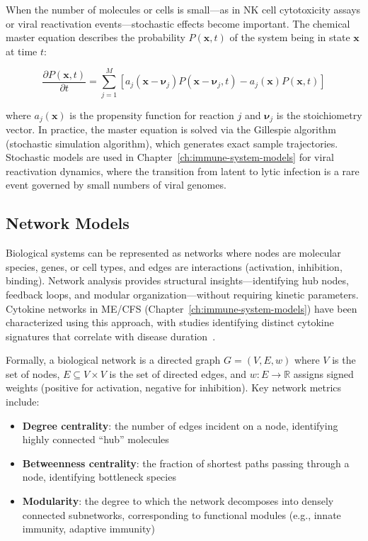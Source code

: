 When the number of molecules or cells is small---as in NK cell cytotoxicity assays or viral reactivation events---stochastic effects become important. The chemical master equation describes the probability $P(\mathbf{x}, t)$ of the system being in state $\mathbf{x}$ at time $t$:

\begin{equation}
\label{eq:master-equation}
\frac{\partial P(\mathbf{x}, t)}{\partial t} = \sum_{j=1}^{M} \left[ a_j(\mathbf{x} - \boldsymbol{\nu}_j) P(\mathbf{x} - \boldsymbol{\nu}_j, t) - a_j(\mathbf{x}) P(\mathbf{x}, t) \right]
\end{equation}

where $a_j(\mathbf{x})$ is the propensity function for reaction $j$ and $\boldsymbol{\nu}_j$ is the stoichiometry vector. In practice, the master equation is solved via the Gillespie algorithm (stochastic simulation algorithm), which generates exact sample trajectories. Stochastic models are used in Chapter~\ref{ch:immune-system-models} for viral reactivation dynamics, where the transition from latent to lytic infection is a rare event governed by small numbers of viral genomes.

\subsection{Network Models}

Biological systems can be represented as networks where nodes are molecular species, genes, or cell types, and edges are interactions (activation, inhibition, binding). Network analysis provides structural insights---identifying hub nodes, feedback loops, and modular organization---without requiring kinetic parameters. Cytokine networks in ME/CFS (Chapter~\ref{ch:immune-system-models}) have been characterized using this approach, with studies identifying distinct cytokine signatures that correlate with disease duration~\cite{Hornig2015,Montoya2017}.

Formally, a biological network is a directed graph $G = (V, E, w)$ where $V$ is the set of nodes, $E \subseteq V \times V$ is the set of directed edges, and $w: E \to \mathbb{R}$ assigns signed weights (positive for activation, negative for inhibition). Key network metrics include:

\begin{itemize}
    \item \textbf{Degree centrality}: the number of edges incident on a node, identifying highly connected ``hub'' molecules
    \item \textbf{Betweenness centrality}: the fraction of shortest paths passing through a node, identifying bottleneck species
    \item \textbf{Modularity}: the degree to which the network decomposes into densely connected subnetworks, corresponding to functional modules (e.g., innate immunity, adaptive immunity)
\end{itemize}

